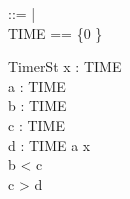 \documentclass{llncs}
\begin{document}
\begin{zed}
\bool ::= \false | \true\\
TIME == \{0 \}\\
\end{zed}

\begin{schema}{TimerSt}
x : \power TIME\\
a : TIME\\
b : TIME\\
c : TIME\\
d : TIME
\where
a \in x\\
b < c\\
c > d
\end{schema}
\end{document}
